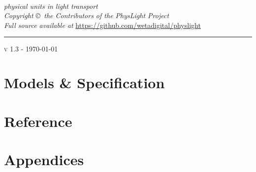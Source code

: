 \documentclass{physlight}
\def\physLightVersion{v 1.3 - \today}
\begin{document}

\begin{titlepage}
\begin{center}

{\fontsize{60}{72}\selectfont \physLight}\\[.3cm]

\textsf{\textit{\fontsize{24}{26.8}\selectfont physical units in light transport}}\\[1.5cm]

\vfill
\large
\textit{Copyright \copyright\ the Contributors of the PhysLight Project}\\[1mm]
\textit{Full source available at} \url{https://github.com/wetadigital/physlight}\\[1mm]

\hrule \vspace{1mm}
\textsc{\large \physLightVersion}\\[0.5cm]

\end{center}
\end{titlepage}

\tableofcontents
\listoffigures
\listoftables


\part{Models \& Specification}\label{part:models}






\part{Reference}\label{part:ref}




\part{Appendices}\label{part:app}
\appendix






\printglossary[title={Index and glossary}]

\clearpage
{}
{}
\printbibliography[heading=refs,filter=refs,prenote=refs,segment=0]
\printbibliography[heading=movies,prenote=movies,filter=movies,segment=0]
\end{document}
